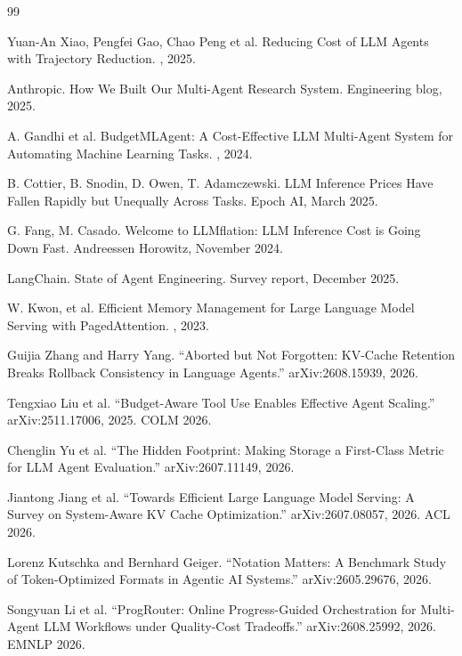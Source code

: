 \documentclass[11pt]{book}
\begin{document}
\begin{thebibliography}{99}

Yuan-An Xiao, Pengfei Gao, Chao Peng et al.
\newblock Reducing Cost of LLM Agents with Trajectory Reduction.
, 2025.

Anthropic.
\newblock How We Built Our Multi-Agent Research System.
\newblock Engineering blog, 2025.

A. Gandhi et al.
\newblock BudgetMLAgent: A Cost-Effective LLM Multi-Agent System for Automating Machine Learning Tasks.
, 2024.

B. Cottier, B. Snodin, D. Owen, T. Adamczewski.
\newblock LLM Inference Prices Have Fallen Rapidly but Unequally Across Tasks.
\newblock Epoch AI, March 2025.

G. Fang, M. Casado.
\newblock Welcome to LLMflation: LLM Inference Cost is Going Down Fast.
\newblock Andreessen Horowitz, November 2024.

LangChain.
\newblock State of Agent Engineering.
\newblock Survey report, December 2025.

W. Kwon, et al.
\newblock Efficient Memory Management for Large Language Model Serving with PagedAttention.
, 2023.


Guijia Zhang and Harry Yang.
``Aborted but Not Forgotten: KV-Cache Retention Breaks Rollback Consistency in Language Agents.''
arXiv:2608.15939, 2026.

Tengxiao Liu et al.
``Budget-Aware Tool Use Enables Effective Agent Scaling.''
arXiv:2511.17006, 2025. COLM 2026.

Chenglin Yu et al.
``The Hidden Footprint: Making Storage a First-Class Metric for LLM Agent Evaluation.''
arXiv:2607.11149, 2026.

Jiantong Jiang et al.
``Towards Efficient Large Language Model Serving: A Survey on System-Aware KV Cache Optimization.''
arXiv:2607.08057, 2026. ACL 2026.

Lorenz Kutschka and Bernhard Geiger.
``Notation Matters: A Benchmark Study of Token-Optimized Formats in Agentic AI Systems.''
arXiv:2605.29676, 2026.

Songyuan Li et al.
``ProgRouter: Online Progress-Guided Orchestration for Multi-Agent LLM Workflows under Quality-Cost Tradeoffs.''
arXiv:2608.25992, 2026. EMNLP 2026.


\end{thebibliography}
\end{document}
